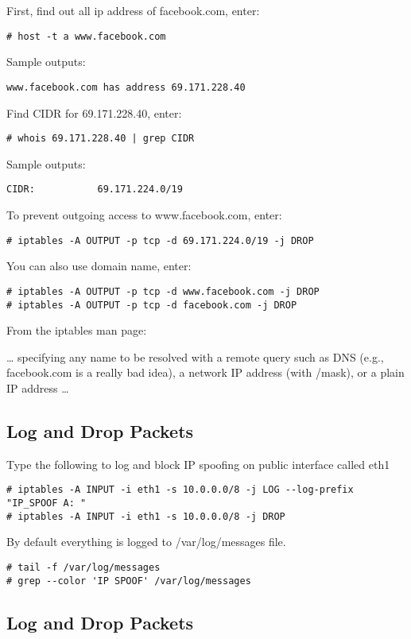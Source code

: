 First, find out all ip address of facebook.com, enter:
\begin{verbatim}
# host -t a www.facebook.com
\end{verbatim}

Sample outputs:
\begin{verbatim}
www.facebook.com has address 69.171.228.40
\end{verbatim}

Find CIDR for 69.171.228.40, enter:
\begin{verbatim}
# whois 69.171.228.40 | grep CIDR
\end{verbatim}

Sample outputs:
\begin{verbatim}
CIDR:           69.171.224.0/19
\end{verbatim}

To prevent outgoing access to www.facebook.com, enter:
\begin{verbatim}
# iptables -A OUTPUT -p tcp -d 69.171.224.0/19 -j DROP
\end{verbatim}

You can also use domain name, enter:
\begin{verbatim}
# iptables -A OUTPUT -p tcp -d www.facebook.com -j DROP
# iptables -A OUTPUT -p tcp -d facebook.com -j DROP
\end{verbatim}

From the iptables man page:

… specifying any name to be resolved with a remote query such as DNS
(e.g., facebook.com is a really bad idea), a network IP address (with
/mask), or a plain IP address …

\subsection{Log and Drop Packets}

Type the following to log and block IP spoofing on public interface called eth1
\begin{verbatim}
# iptables -A INPUT -i eth1 -s 10.0.0.0/8 -j LOG --log-prefix "IP_SPOOF A: "
# iptables -A INPUT -i eth1 -s 10.0.0.0/8 -j DROP
\end{verbatim}

By default everything is logged to /var/log/messages file.
\begin{verbatim}
# tail -f /var/log/messages
# grep --color 'IP SPOOF' /var/log/messages
\end{verbatim}

\subsection{Log and Drop Packets}

